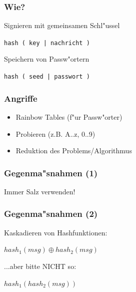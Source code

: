 \begin{frame}
\frametitle{Wie?}
	Signieren mit gemeinsamen Schl"ussel
	\par
	\begin{center}\large{\texttt{hash ( key | nachricht )}}\end{center}
	\vspace{5mm}
	Speichern von Passw"ortern
	\par
	\begin{center}\large{\texttt{hash ( seed | passwort )}}\end{center}
\end{frame}

\begin{frame}
\frametitle{Angriffe}
	\begin{itemize}
		\item Rainbow Tables (f"ur Passw"orter)
		\item Probieren (z.B. A..z, 0..9)
		\item Reduktion des Problems/Algorithmus
	\end{itemize}
\end{frame}

\begin{frame}
\frametitle{Gegenma"snahmen (1)}
	\large{Immer Salz verwenden!}
\end{frame}

\begin{frame}
\frametitle{Gegenma"snahmen (2)}
	Kaskadieren von Hashfunktionen:
	\par
	\begin{center}\large{\texttt{$hash_1 (msg) \oplus hash_2(msg)$}}\end{center}
	\vspace{5mm}
	\par
	...aber bitte \large{NICHT} so:
	\par
	\begin{center}\large{\texttt{$hash_1 (hash_2(msg))$}}\end{center}
\end{frame}


